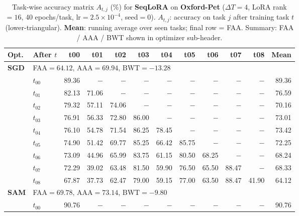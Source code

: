 
\begin{table}[ht]
\centering
\caption{%
  Task-wise accuracy matrix $A_{t,j}$ (\%) for \textbf{SeqLoRA} on \textbf{Oxford-Pet}
  ($\Delta T=4$, LoRA rank$=16$, 40 epochs/task, lr$=2.5\times10^{-4}$, seed$=0$).
  $A_{t,j}$: accuracy on task $j$ after training task $t$ (lower-triangular).
  \textbf{Mean}: running average over seen tasks; final row = FAA.
  Summary: FAA / AAA / BWT shown in optimizer sub-header.
}
\label{tab:raw_seqlora_oxfordpet}
\setlength{\tabcolsep}{2.8pt}
\renewcommand{\arraystretch}{0.88}
\scriptsize
\begin{tabular}{@{}l l r r r r r r r r r r@{}}
\toprule
\textbf{Opt.} & \textbf{After $t$} & \textbf{t00} & \textbf{t01} & \textbf{t02} & \textbf{t03} & \textbf{t04} & \textbf{t05} & \textbf{t06} & \textbf{t07} & \textbf{t08} & \textbf{Mean} \\
\midrule
\multirow{10}{*}{\textbf{SGD}} & \multicolumn{11}{l}{\quad\small FAA$=64.12$,\; AAA$=69.94$,\; BWT$=-13.28$} \\
 & $t_{00}$ & 89.36 & $-$ & $-$ & $-$ & $-$ & $-$ & $-$ & $-$ & $-$ & 89.36 \\
 & $t_{01}$ & 82.13 & 71.06 & $-$ & $-$ & $-$ & $-$ & $-$ & $-$ & $-$ & 76.59 \\
 & $t_{02}$ & 79.32 & 57.11 & 74.06 & $-$ & $-$ & $-$ & $-$ & $-$ & $-$ & 70.16 \\
 & $t_{03}$ & 76.91 & 56.33 & 72.80 & 86.00 & $-$ & $-$ & $-$ & $-$ & $-$ & 73.01 \\
 & $t_{04}$ & 76.10 & 54.78 & 71.54 & 86.25 & 78.45 & $-$ & $-$ & $-$ & $-$ & 73.42 \\
 & $t_{05}$ & 74.90 & 51.42 & 69.77 & 85.25 & 66.42 & 85.75 & $-$ & $-$ & $-$ & 72.25 \\
 & $t_{06}$ & 73.09 & 44.96 & 65.99 & 83.75 & 61.15 & 80.50 & 68.25 & $-$ & $-$ & 68.24 \\
 & $t_{07}$ & 72.29 & 39.02 & 63.48 & 81.50 & 59.90 & 76.50 & 65.50 & 88.47 & $-$ & 68.33 \\
 & $t_{08}$ & 67.87 & 37.73 & 62.47 & 79.00 & 59.15 & 77.00 & 63.50 & 88.47 & 41.90 & 64.12 \\
\midrule
\multirow{10}{*}{\textbf{SAM}} & \multicolumn{11}{l}{\quad\small FAA$=69.78$,\; AAA$=73.14$,\; BWT$=-9.80$} \\
 & $t_{00}$ & 90.76 & $-$ & $-$ & $-$ & $-$ & $-$ & $-$ & $-$ & $-$ & 90.76 \\

\end{tabular}
\end{table}

